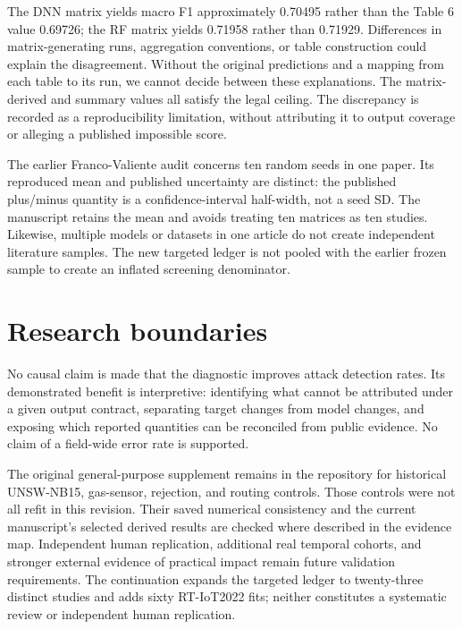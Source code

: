 \documentclass[onecolumn]{svjour3}
\begin{document}
The DNN matrix yields macro F1 approximately 0.70495 rather than the Table 6 value 0.69726; the RF matrix yields 0.71958 rather than 0.71929. Differences in matrix-generating runs, aggregation conventions, or table construction could explain the disagreement. Without the original predictions and a mapping from each table to its run, we cannot decide between these explanations. The matrix-derived and summary values all satisfy the legal ceiling. The discrepancy is recorded as a reproducibility limitation, without attributing it to output coverage or alleging a published impossible score.

The earlier Franco-Valiente audit concerns ten random seeds in one paper. Its reproduced mean and published uncertainty are distinct: the published plus/minus quantity is a confidence-interval half-width, not a seed SD. The manuscript retains the mean and avoids treating ten matrices as ten studies. Likewise, multiple models or datasets in one article do not create independent literature samples. The new targeted ledger is not pooled with the earlier frozen sample to create an inflated screening denominator.

\section{Research boundaries}
No causal claim is made that the diagnostic improves attack detection rates. Its demonstrated benefit is interpretive: identifying what cannot be attributed under a given output contract, separating target changes from model changes, and exposing which reported quantities can be reconciled from public evidence. No claim of a field-wide error rate is supported.

The original general-purpose supplement remains in the repository for historical UNSW-NB15, gas-sensor, rejection, and routing controls. Those controls were not all refit in this revision. Their saved numerical consistency and the current manuscript's selected derived results are checked where described in the evidence map. Independent human replication, additional real temporal cohorts, and stronger external evidence of practical impact remain future validation requirements. The continuation expands the targeted ledger to twenty-three distinct studies and adds sixty RT-IoT2022 fits; neither constitutes a systematic review or independent human replication.
\end{document}
